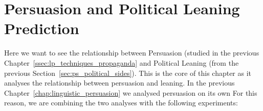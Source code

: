 

\section{\statusorange Persuasion and Political Leaning Prediction}
\label{sec:ps_prop_and_leaning}

Here we want to see the relationship between Persuasion (studied in the previous Chapter~\ref{ssec:lp_techniques_propaganda} and Political Leaning (from the previous Section~\ref{sec:ps_political_sides}).
This is the core of this chapter as it analyses the relationship between persuasion and leaning. In the previous Chapter~\ref{chap:linguistic_persuasion} we analysed persuasion on its own
For this reason, we are combining the two analyses with the following experiments:

